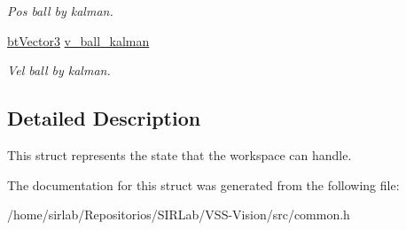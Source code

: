 \begin{DoxyCompactItemize}
\begin{DoxyCompactList}\small\item\em Pos ball by kalman. \end{DoxyCompactList}\item 
\hypertarget{structcommon_1_1State_adc2d51526dffd90f889324c90fa082a0}{\hyperlink{structcommon_1_1btVector3}{bt\-Vector3} \hyperlink{structcommon_1_1State_adc2d51526dffd90f889324c90fa082a0}{v\-\_\-ball\-\_\-kalman}}\label{structcommon_1_1State_adc2d51526dffd90f889324c90fa082a0}

\begin{DoxyCompactList}\small\item\em Vel ball by kalman. \end{DoxyCompactList}\end{DoxyCompactItemize}


\subsection{Detailed Description}
This struct represents the state that the workspace can handle. 

The documentation for this struct was generated from the following file\-:\begin{DoxyCompactItemize}
\item 
/home/sirlab/\-Repositorios/\-S\-I\-R\-Lab/\-V\-S\-S-\/\-Vision/src/common.\-h\end{DoxyCompactItemize}
